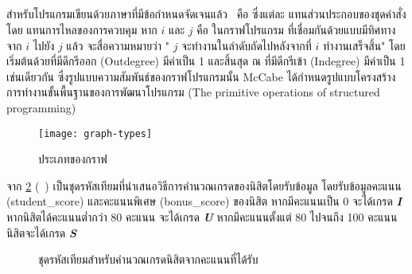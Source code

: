 \subsection{\FirstTimeDefine{\ProgramGraph}{\ProgramGraphEN}} 

สำหรับโปรแกรมเขียนด้วยภาษาที่มีข้อกำหนดจัดเจนแล้ว {\ProgramGraph}\ คือ \FirstTimeDefine{\DirectedGraph}{\DirectedGraphEN} 
ซึ่งแต่ละ {\FirstTimeDefine{\Node}{\NodeEN}} แทนส่วนประกอบของชุดคำสั่ง โดย{\FirstTimeDefine{\Edge}{\EdgeEN}} แทนการไหลของการควบคุม 
หาก $i$ และ $j$ คือ {\Node}ในกราฟโปรแกรม ที่เชื่อมกันด้วย{\Edge}แบบมีทิศทางจาก $i$ ไปยัง $j$ แล้ว จะสื่อความหมายว่า 
"{\Node} $j$ จะทำงานในลำดับถัดไปหลังจากที่ $i$ ทำงานเสร็จสิ้น" \cite{Jorgensen2013} โดยเริ่มต้นด้วย{\Node}ที่มีดีกรีออก 
(Outdegree) มีค่าเป็น 1 และสิ้นสุด ณ \Node ที่มีดีกรีเข้า (Indegree) มีค่าเป็น 1 เช่นเดียวกัน ซึ่งรูปแบบความสัมพันธ์ของกราฟโปรแกรมนั้น 
McCabe \cite{Watson1996} ได้กำหนดรูปแบบโครงสร้างการทำงานขั้นพื้นฐานของการพัฒนาโปรแกรม 
(The primitive operations of structured programming) 

\begin{figure}[ht!]
    \centering
    \texttt{[image: graph-types]}
    \caption{ประเภทของกราฟ}
    \label{fig:graphtype}
\end{figure}

จาก{\figurename} \ref{fig:pseudocodeGrading} (\pagename\ \pageref{fig:pseudocodeGrading}) 
เป็นชุดรหัสเทียมที่นำเสนอวิธีการคำนวณเกรดของนิสิตโดยรับข้อมูล โดยรับข้อมูลคะแนน (student\_score) และคะแนนพิเศษ (bonus\_score) 
ของนิสิต หากมีคะแนนเป็น 0 จะได้เกรด \emph{{\bf I}} หากนิสิตได้คะแนนต่ำกว่า 80 คะแนน จะได้เกรด {\emph{\bf U}} หากมีคะแนนตั้งแต่ 80 
ไปจนถึง 100 คะแนน นิสิตจะได้เกรด {\emph{\bf S}} 

\begin{figure}[ht!]
    \begin{algorithm}[H]
        \begin{algorithmic}[1]

            \ENDIF


            \ENDIF

        \end{algorithmic}
    \end{algorithm}
    \caption{ชุดรหัสเทียมสำหรับคำนวณเกรดนิสิตจากคะแนนที่ได้รับ}
    \label{fig:pseudocodeGrading}
\end{figure}


